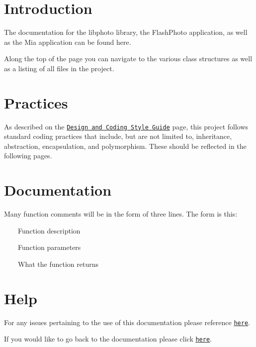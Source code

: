 \section*{Introduction}

The documentation for the libphoto library, the Flash\-Photo application, as well as the Mia application can be found here.\par
 Along the top of the page you can navigate to the various class structures as well as a listing of all files in the project.

\section*{Practices}

As described on the \href{../../web/static/views/design.html}{\tt Design and Coding Style Guide} page, this project follows standard coding practices that include, but are not limited to, inheritance, abstraction, encapsulation, and polymorphism. These should be reflected in the following pages.\par


\section*{Documentation}

Many function comments will be in the form of three lines. The form is this\-: \par
 ~~~~Function description\par
 ~~~~Function parameters\par
 ~~~~What the function returns

\section*{Help}

For any issues pertaining to the use of this documentation please reference \href{www.doxygen.org/}{\tt here}.

If you would like to go back to the documentation please click \href{../../web/index.html}{\tt here}. 